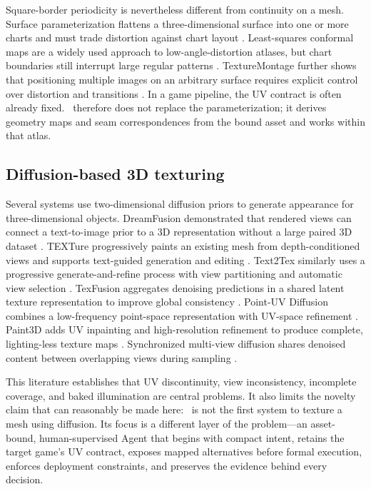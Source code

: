 Square-border periodicity is nevertheless different from continuity on a mesh.
Surface parameterization flattens a three-dimensional surface into one or more
charts and must trade distortion against chart layout
\citep{floater2005parameterization}. Least-squares conformal maps are a widely
used approach to low-angle-distortion atlases, but chart boundaries still
interrupt large regular patterns \citep{levy2002lscm}. TextureMontage further
shows that positioning multiple images on an arbitrary surface requires explicit
control over distortion and transitions \citep{zhou2005texturemontage}. In a game
pipeline, the UV contract is often already fixed. \skinsmith\ therefore does not
replace the parameterization; it derives geometry maps and seam correspondences
from the bound asset and works within that atlas.

\subsection{Diffusion-based 3D texturing}

Several systems use two-dimensional diffusion priors to generate appearance for
three-dimensional objects. DreamFusion demonstrated that rendered views can
connect a text-to-image prior to a 3D representation without a large paired 3D
dataset \citep{poole2022dreamfusion}. TEXTure progressively paints an existing
mesh from depth-conditioned views and supports text-guided generation and editing
\citep{richardson2023texture}. Text2Tex similarly uses a progressive
generate-and-refine process with view partitioning and automatic view selection
\citep{chen2023text2tex}. TexFusion aggregates denoising predictions in a shared
latent texture representation to improve global consistency
\citep{cao2023texfusion}. Point-UV Diffusion combines a low-frequency point-space
representation with UV-space refinement \citep{yu2023pointuv}. Paint3D adds UV
inpainting and high-resolution refinement to produce complete, lighting-less
texture maps \citep{zeng2024paint3d}. Synchronized multi-view diffusion shares
denoised content between overlapping views during sampling
\citep{liu2024syncmvd}.

This literature establishes that UV discontinuity, view inconsistency,
incomplete coverage, and baked illumination are central problems. It also limits
the novelty claim that can reasonably be made here: \skinsmith\ is not the first
system to texture a mesh using diffusion. Its focus is a different layer of the
problem---an asset-bound, human-supervised Agent that begins with compact intent,
retains the target game's UV contract, exposes mapped alternatives before formal
execution, enforces deployment constraints, and preserves the evidence behind
every decision.

